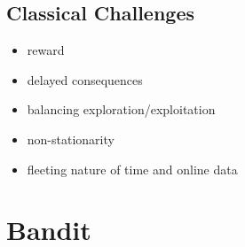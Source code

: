 \documentclass[]{article}
\theoremstyle{definition}
\begin{document}
\subsection{Classical Challenges}
\label{sub:classical_challenges}
\begin{itemize}
    \item reward
    \item delayed consequences
    \item balancing exploration/exploitation
    \item non-stationarity
    \item fleeting nature of time and online data
\end{itemize}





\section{Bandit}
\label{sec:bandit}
\end{document}
